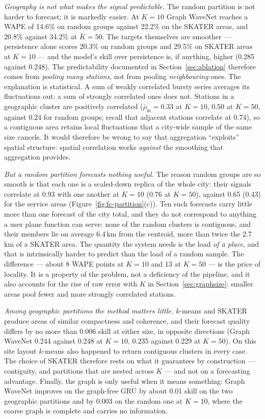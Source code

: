 \emph{Geography is not what makes the signal predictable.} The random partition is not harder to
forecast; it is markedly easier. At $K{=}10$ Graph WaveNet reaches a WAPE of 14.6\% on random
groups against 22.2\% on the SKATER areas, and 20.8\% against 34.2\% at $K{=}50$. The targets
themselves are smoother --- persistence alone scores 20.3\% on random groups and 29.5\% on SKATER
areas at $K{=}10$ --- and the model's skill over persistence is, if anything, higher (0.285
against 0.248). The predictability documented in Section~\ref{sec:ablation} therefore comes from
\emph{pooling many stations}, not from pooling \emph{neighbouring} ones. The explanation is
statistical. A sum of weakly correlated bursty series averages its fluctuations out; a sum of
strongly correlated ones does not. Stations in a geographic cluster are positively correlated
($\bar\rho_\text{in}=0.33$ at $K{=}10$, 0.50 at $K{=}50$, against 0.24 for random groups; recall that
adjacent stations correlate at 0.74), so a contiguous area retains local fluctuations that a
city-wide sample of the same size cancels. It would therefore be wrong
to say that aggregation ``exploits'' spatial structure: spatial correlation works \emph{against} the
smoothing that aggregation provides.

\emph{But a random partition forecasts nothing useful.} The reason random groups are so smooth is
that each one is a scaled-down replica of the whole city: their signals correlate at 0.93 with one
another at $K{=}10$ (0.76 at $K{=}50$), against 0.65 (0.43) for the service areas
(Figure~\ref{fig:fc-partition}(c)). Ten such forecasts carry little more than one forecast of the
city total, and they do not correspond to anything a user plane function can serve: none of the
random clusters is contiguous, and their members lie on average 6.4\,km from the centroid, more than
twice the 2.7\,km of a SKATER area. The quantity the system needs is the load \emph{of a place}, and
that is intrinsically harder to predict than the load of a random sample. The difference --- about
8 WAPE points at $K{=}10$ and 13 at $K{=}50$ --- is the price of locality. It is a property of the
problem, not a deficiency of the pipeline, and it also accounts for the rise of raw error with $K$ in
Section~\ref{sec:graphsize}: smaller areas pool fewer and more strongly correlated stations.

\emph{Among geographic partitions the method matters little.} $k$-means and SKATER produce areas of
similar compactness and coherence, and their forecast quality differs by no more than 0.006 skill at
either size, in opposite directions (Graph WaveNet 0.244 against 0.248 at $K{=}10$, 0.235 against
0.229 at $K{=}50$). On this site layout $k$-means also happened to return contiguous clusters in every case.
The choice of SKATER therefore rests on what it guarantees by construction --- contiguity, and
partitions that are nested across $K$ --- and not on a forecasting advantage. Finally, the graph is
only useful when it means something: Graph WaveNet improves on the graph-free GRU by about 0.01
skill on the two geographic partitions and by 0.003 on the random one at $K{=}10$, where the coarse
graph is complete and carries no information.

